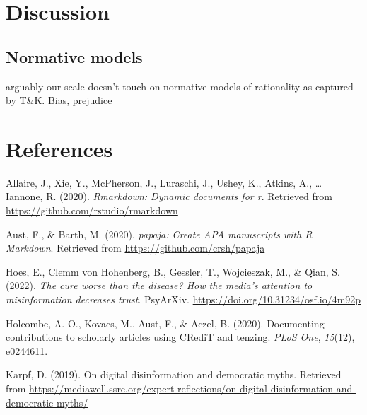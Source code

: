 \documentclass[
  ,jou,floatsintext]{apa6}
\newlength{\cslhangindent}
\newlength{\cslentryspacingunit} %
\newenvironment{CSLReferences}[2] %
 {%
  \setlength{\parindent}{0pt}
  \ifodd #1
  \let\oldpar\par
  \def\par{\hangindent=\cslhangindent\oldpar}
  \fi
  \setlength{\parskip}{#2\cslentryspacingunit}
 }%
 {}
\begin{document}
\hypertarget{discussion}{%
\section{Discussion}\label{discussion}}

\hypertarget{normative-models}{%
\subsection{Normative models}\label{normative-models}}

arguably our scale doesn't touch on normative models of rationality as captured by T\&K. Bias, prejudice

\hypertarget{references}{%
\section*{References}\label{references}}

\hypertarget{refs}{}
\begin{CSLReferences}{1}{0}
\leavevmode{}%
Allaire, J., Xie, Y., McPherson, J., Luraschi, J., Ushey, K., Atkins, A., \ldots{} Iannone, R. (2020). \emph{Rmarkdown: Dynamic documents for r}. Retrieved from \url{https://github.com/rstudio/rmarkdown}

\leavevmode{}%
Aust, F., \& Barth, M. (2020). \emph{{papaja}: {Create} {APA} manuscripts with {R Markdown}}. Retrieved from \url{https://github.com/crsh/papaja}

\leavevmode{}%
Hoes, E., Clemm von Hohenberg, B., Gessler, T., Wojcieszak, M., \& Qian, S. (2022). \emph{The cure worse than the disease? How the media's attention to misinformation decreases trust}. PsyArXiv. \url{https://doi.org/10.31234/osf.io/4m92p}

\leavevmode{}%
Holcombe, A. O., Kovacs, M., Aust, F., \& Aczel, B. (2020). Documenting contributions to scholarly articles using CRediT and tenzing. \emph{PLoS One}, \emph{15}(12), e0244611.

\leavevmode{}%
Karpf, D. (2019). On digital disinformation and democratic myths. Retrieved from \url{https://mediawell.ssrc.org/expert-reflections/on-digital-disinformation-and-democratic-myths/}

\end{CSLReferences}
\end{document}
